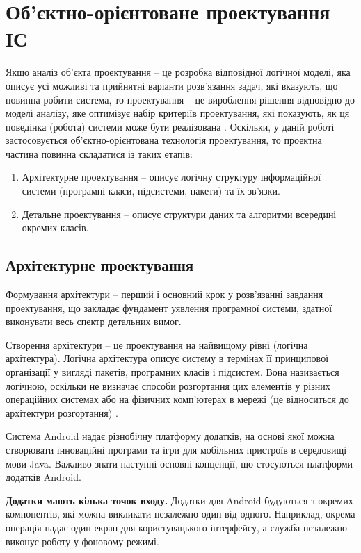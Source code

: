 \documentclass[../main.tex]{subfiles}
\begin{document}
\chapter{Об’єктно-орієнтоване проектування ІС}

Якщо аналіз об’єкта проектування – це розробка відповідної логічної моделі, яка описує усі можливі та прийнятні варіанти розв’язання задач, які вказують, що повинна робити система, то проектування – це вироблення рішення відповідно до моделі аналізу, яке оптимізує набір критеріїв проектування, які  показують, як ця поведінка (робота) системи може бути реалізована \cite{diploma_guidelines}.
Оскільки, у даній роботі застосовується об’єктно-орієнтована технологія проектування, то проектна частина повинна складатися із таких етапів:

\begin{enumerate}
	\item Архітектурне проектування – описує логічну структуру інформаційної системи (програмні класи, підсистеми,  пакети) та їх зв’язки.
	\item Детальне проектування – описує структури даних та алгоритми всередині окремих класів. 
\end{enumerate}

\section{Архітектурне проектування}
Формування архітектури – перший і основний крок у розв’язанні завдання проектування, що закладає фундамент уявлення програмної системи, здатної виконувати весь спектр детальних вимог. \cite{diploma_guidelines2}

Створення архітектури – це проектування на найвищому рівні (логічна архітектура). Логічна архітектура описує систему в термінах її принципової організації у вигляді пакетів, програмних класів і підсистем. Вона називається логічною, оскільки не визначає способи розгортання цих елементів у різних операційних системах або на фізичних комп’ютерах в мережі (це відноситься до архітектури розгортання) \cite{diploma_guidelines}.

Система Android надає різнобічну платформу додатків, на основі якої можна створювати інноваційні програми та ігри для мобільних пристроїв в середовищі мови Java. Важливо знати наступні основні концепції, що стосуються платформи додатків Android.

\textbf{Додатки мають кілька точок входу.} 
Додатки для Android будуються з окремих компонентів, які можна викликати незалежно один від одного. Наприклад, окрема операція надає один екран для користувацького інтерфейсу, а служба незалежно виконує роботу у фоновому режимі.
	
\end{document}
